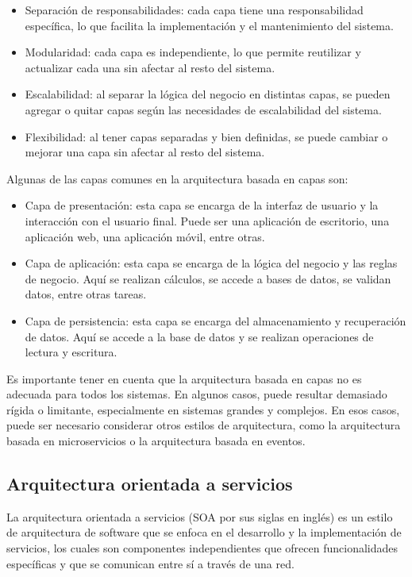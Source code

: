 \documentclass[executivepaper]{article}
\begin{document}
\begin{itemize}
\item Separación de responsabilidades: cada capa tiene una responsabilidad específica, lo que facilita la implementación y el mantenimiento del sistema.
\item Modularidad: cada capa es independiente, lo que permite reutilizar y actualizar cada una sin afectar al resto del sistema.
\item Escalabilidad: al separar la lógica del negocio en distintas capas, se pueden agregar o quitar capas según las necesidades de escalabilidad del sistema.
\item Flexibilidad: al tener capas separadas y bien definidas, se puede cambiar o mejorar una capa sin afectar al resto del sistema.
\end{itemize}

Algunas de las capas comunes en la arquitectura basada en capas son:

\begin{itemize}
\item Capa de presentación: esta capa se encarga de la interfaz de usuario y la interacción con el usuario final. Puede ser una aplicación de escritorio, una aplicación web, una aplicación móvil, entre otras.
\item Capa de aplicación: esta capa se encarga de la lógica del negocio y las reglas de negocio. Aquí se realizan cálculos, se accede a bases de datos, se validan datos, entre otras tareas.
\item Capa de persistencia: esta capa se encarga del almacenamiento y recuperación de datos. Aquí se accede a la base de datos y se realizan operaciones de lectura y escritura.
\end{itemize}

Es importante tener en cuenta que la arquitectura basada en capas no es adecuada para todos los sistemas. En algunos casos, puede resultar demasiado rígida o limitante, especialmente en sistemas grandes y complejos. En esos casos, puede ser necesario considerar otros estilos de arquitectura, como la arquitectura basada en microservicios o la arquitectura basada en eventos.

\subsection{Arquitectura orientada a servicios}

La arquitectura orientada a servicios (SOA por sus siglas en inglés) es un estilo de arquitectura de software que se enfoca en el desarrollo y la implementación de servicios, los cuales son componentes independientes que ofrecen funcionalidades específicas y que se comunican entre sí a través de una red.
\end{document}
